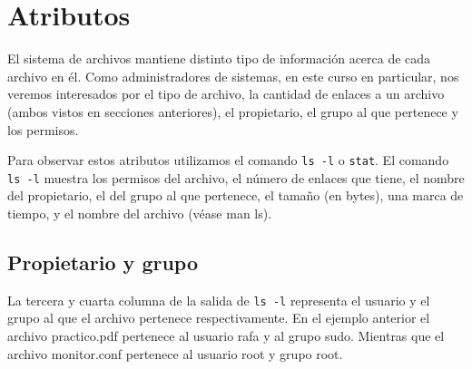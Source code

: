 \documentclass[12pt]{article}
\begin{document}
\section*{Atributos}
El sistema de archivos mantiene distinto tipo de información acerca de cada archivo en él. 
Como administradores de sistemas, en este curso en particular, nos veremos interesados
por el tipo de archivo, la cantidad de enlaces a un archivo (ambos vistos en secciones 
anteriores), el propietario, el grupo al que pertenece y los permisos. 

Para observar estos atributos utilizamos el comando \texttt{ls -l} o \texttt{stat}. 
El comando \texttt{ls -l} muestra los permisos del archivo,  el  número  de  enlaces  
que  tiene,  el  nombre  del  propietario,  el  del  grupo  al  que  pertenece, 
el tamaño (en bytes), una marca de tiempo, y el nombre del archivo (véase man ls).



\subsection*{Propietario y grupo}
La tercera y cuarta columna de la salida de \texttt{ls -l} representa 
el usuario y el grupo al que el archivo 
pertenece respectivamente. En el ejemplo anterior el archivo 
practico.pdf pertenece al usuario rafa y al grupo sudo. Mientras que 
el archivo monitor.conf pertenece al usuario root y grupo root. 
\end{document}
